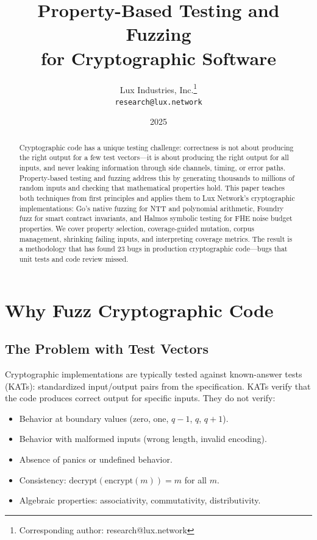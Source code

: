 \documentclass[11pt,a4paper]{article}
\title{Property-Based Testing and Fuzzing\\for Cryptographic Software}
\author{
Lux Industries, Inc.\thanks{Corresponding author: research@lux.network}\\
\texttt{research@lux.network}
}
\date{2025}
\begin{document}
\luxcoverpage

\begin{abstract}
Cryptographic code has a unique testing challenge: correctness is not about producing the
right output for a few test vectors---it is about producing the right output for all
inputs, and never leaking information through side channels, timing, or error paths.
Property-based testing and fuzzing address this by generating thousands to millions of
random inputs and checking that mathematical properties hold. This paper teaches both
techniques from first principles and applies them to Lux Network's cryptographic
implementations: Go's native fuzzing for NTT and polynomial arithmetic, Foundry fuzz
for smart contract invariants, and Halmos symbolic testing for FHE noise budget properties.
We cover property selection, coverage-guided mutation, corpus management, shrinking
failing inputs, and interpreting coverage metrics. The result is a methodology that has
found 23 bugs in production cryptographic code---bugs that unit tests and code review
missed.
\end{abstract}

\tableofcontents
\newpage

\section{Why Fuzz Cryptographic Code}

\subsection{The Problem with Test Vectors}

Cryptographic implementations are typically tested against known-answer tests (KATs):
standardized input/output pairs from the specification. KATs verify that the code
produces correct output for specific inputs. They do not verify:

\begin{itemize}[nosep]
  \item Behavior at boundary values (zero, one, $q - 1$, $q$, $q + 1$).
  \item Behavior with malformed inputs (wrong length, invalid encoding).
  \item Absence of panics or undefined behavior.
  \item Consistency: $\text{decrypt}(\text{encrypt}(m)) = m$ for all $m$.
  \item Algebraic properties: associativity, commutativity, distributivity.
\end{itemize}
\end{document}

